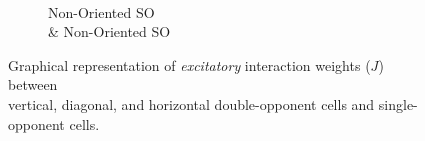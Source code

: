\documentclass[journal,onecolumn]{IEEEtran}
\begin{document}
{\begin{figure}
\begin{subfigure}[b]{0.2\textwidth}
            \caption{\\ Non-Oriented SO \\ \& Non-Oriented SO}
    \end{subfigure}%
    \caption{Graphical representation of \textit{excitatory} interaction weights ($J$) between\\ vertical, diagonal, and horizontal double-opponent cells and single-opponent cells.}
\end{figure}
\clearpage
}
\end{document}
